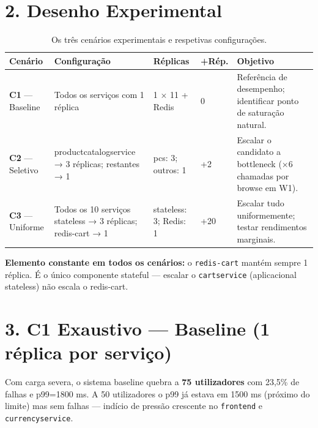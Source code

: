 \documentclass[a4paper,11pt]{article}
\begin{document}
\section{2. Desenho Experimental}

\begin{table}[h]
\centering
\caption{Os três cenários experimentais e respetivas configurações.}
\begin{tabular}{p{2.5cm}p{4cm}p{2cm}p{1cm}p{4cm}}
\toprule
\textbf{Cenário} & \textbf{Configuração} & \textbf{Réplicas} & \textbf{+Rép.} & \textbf{Objetivo} \\
\midrule
\textbf{C1} — Baseline   & Todos os serviços com 1 réplica & 1 × 11 + Redis & 0 & Referência de desempenho; identificar ponto de saturação natural. \\
\addlinespace
\textbf{C2} — Seletivo   & productcatalogservice → 3 réplicas; restantes → 1 & pcs: 3; outros: 1 & +2 & Escalar o candidato a bottleneck (×6 chamadas por browse em W1). \\
\addlinespace
\textbf{C3} — Uniforme   & Todos os 10 serviços stateless → 3 réplicas; redis-cart → 1 & stateless: 3; Redis: 1 & +20 & Escalar tudo uniformemente; testar rendimentos marginais. \\
\bottomrule
\end{tabular}
\end{table}

\textbf{Elemento constante em todos os cenários:} o \texttt{redis-cart} mantém sempre 1 réplica. É o único componente stateful — escalar o \texttt{cartservice} (aplicacional stateless) não escala o redis-cart.

\section{3. C1 Exaustivo — Baseline (1 réplica por serviço)}

Com carga severa, o sistema baseline quebra a \textbf{75 utilizadores} com 23{,}5\% de falhas e p99=1800 ms. A 50 utilizadores o p99 já estava em 1500 ms (próximo do limite) mas sem falhas — indício de pressão crescente no \texttt{frontend} e \texttt{currencyservice}.
\end{document}
